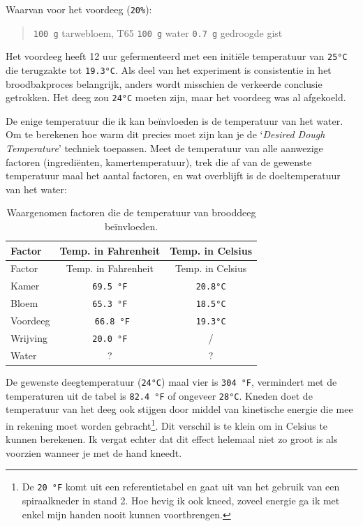 \documentclass[
  11pt,
  dutch,
]{memoir}
\begin{document}
Waarvan voor het voordeeg (\texttt{20\%}):

\begin{quote}
\texttt{100\ g} tarwebloem, T65 \newline \texttt{100\ g} water \newline
\texttt{0.7\ g} gedroogde gist \newline
\end{quote}

Het voordeeg heeft 12 uur gefermenteerd met een initiële temperatuur van
\texttt{25°C} die terugzakte tot \texttt{19.3°C}. Als deel van het
experiment is consistentie in het broodbakproces belangrijk, anders
wordt misschien de verkeerde conclusie getrokken. Het deeg zou
\texttt{24°C} moeten zijn, maar het voordeeg was al afgekoeld.

De enige temperatuur die ik kan beïnvloeden is de temperatuur van het
water. Om te berekenen hoe warm dit precies moet zijn kan je de
`\emph{Desired Dough Temperature}' techniek toepassen. Meet de
temperatuur van alle aanwezige factoren (ingrediënten,
kamertemperatuur), trek die af van de gewenste temperatuur maal het
aantal factoren, en wat overblijft is de doeltemperatuur van het water:

\begin{longtable}[]{@{}lcc@{}}
\caption{Waargenomen factoren die de temperatuur van brooddeeg
beïnvloeden. \label{temptable}}\tabularnewline
\toprule
Factor & Temp. in Fahrenheit & Temp. in Celsius\tabularnewline
\midrule
\endfirsthead
\toprule
Factor & Temp. in Fahrenheit & Temp. in Celsius\tabularnewline
\midrule
\endhead
Kamer & \texttt{69.5\ °F} & \texttt{20.8°C}\tabularnewline
Bloem & \texttt{65.3\ °F} & \texttt{18.5°C}\tabularnewline
Voordeeg & ~\texttt{66.8\ °F} & \texttt{19.3°C}\tabularnewline
Wrijving & \texttt{20.0\ °F} & /\tabularnewline
Water & ? & ?\tabularnewline
\bottomrule
\end{longtable}

De gewenste deegtemperatuur (\texttt{24°C}) maal vier is
\texttt{304\ °F}, vermindert met de temperaturen uit de tabel is
\texttt{82.4\ °F} of ongeveer \texttt{28°C}. Kneden doet de temperatuur
van het deeg ook stijgen door middel van kinetische energie die mee in
rekening moet worden gebracht\footnote{De \texttt{20\ °F} komt uit een
  referentietabel en gaat uit van het gebruik van een spiraalkneder in
  stand 2. Hoe hevig ik ook kneed, zoveel energie ga ik met enkel mijn
  handen nooit kunnen voortbrengen.}. Dit verschil is te klein om in
Celsius te kunnen berekenen. Ik vergat echter dat dit effect helemaal
niet zo groot is als voorzien wanneer je met de hand kneedt.
\end{document}
